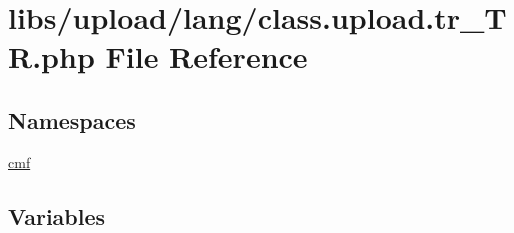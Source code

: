\hypertarget{class_8upload_8tr___t_r_8php}{}\section{libs/upload/lang/class.upload.\+tr\+\_\+\+T\+R.\+php File Reference}
\label{class_8upload_8tr___t_r_8php}
\subsection*{Namespaces}
\begin{DoxyCompactItemize}
\item 
 \hyperlink{namespacecmf}{cmf}
\end{DoxyCompactItemize}
\subsection*{Variables}
